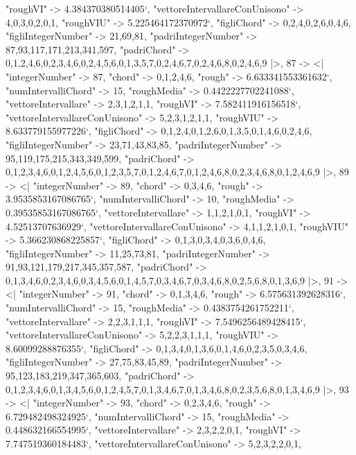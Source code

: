\documentclass[
]{article}
\begin{document}
\begin{DatasetVerbatim}
    "roughVI" -> 4.384370380514405`,
    "vettoreIntervallareConUnisono" -> {4,0,3,0,2,0,1},
    "roughVIU" -> 5.225464172370972`,
    "figliChord" -> {{0,2,4},{0,2,6},{0,4,6}},
    "figliIntegerNumber" -> {21,69,81},
    "padriIntegerNumber" -> {87,93,117,171,213,341,597},
    "padriChord" -> {{0,1,2,4,6},{0,2,3,4,6},{0,2,4,5,6},{0,1,3,5,7},{0,2,4,6,7},{0,2,4,6,8},{0,2,4,6,9}}
  |>,
  87 -> <|
    "integerNumber" -> 87,
    "chord" -> {0,1,2,4,6},
    "rough" -> 6.633341553361632`,
    "numIntervalliChord" -> 15,
    "roughMedia" -> 0.4422227702241088`,
    "vettoreIntervallare" -> {2,3,1,2,1,1},
    "roughVI" -> 7.582411916156518`,
    "vettoreIntervallareConUnisono" -> {5,2,3,1,2,1,1},
    "roughVIU" -> 8.633779155977226`,
    "figliChord" -> {{0,1,2,4},{0,1,2,6},{0,1,3,5},{0,1,4,6},{0,2,4,6}},
    "figliIntegerNumber" -> {23,71,43,83,85},
    "padriIntegerNumber" -> {95,119,175,215,343,349,599},
    "padriChord" -> {{0,1,2,3,4,6},{0,1,2,4,5,6},{0,1,2,3,5,7},{0,1,2,4,6,7},{0,1,2,4,6,8},{0,2,3,4,6,8},{0,1,2,4,6,9}}
  |>,
  89 -> <|
    "integerNumber" -> 89,
    "chord" -> {0,3,4,6},
    "rough" -> 3.9535853167086765`,
    "numIntervalliChord" -> 10,
    "roughMedia" -> 0.39535853167086765`,
    "vettoreIntervallare" -> {1,1,2,1,0,1},
    "roughVI" -> 4.52513707636929`,
    "vettoreIntervallareConUnisono" -> {4,1,1,2,1,0,1},
    "roughVIU" -> 5.366230868225857`,
    "figliChord" -> {{0,1,3},{0,3,4},{0,3,6},{0,4,6}},
    "figliIntegerNumber" -> {11,25,73,81},
    "padriIntegerNumber" -> {91,93,121,179,217,345,357,587},
    "padriChord" -> {{0,1,3,4,6},{0,2,3,4,6},{0,3,4,5,6},{0,1,4,5,7},{0,3,4,6,7},{0,3,4,6,8},{0,2,5,6,8},{0,1,3,6,9}}
  |>,
  91 -> <|
    "integerNumber" -> 91,
    "chord" -> {0,1,3,4,6},
    "rough" -> 6.575631392628316`,
    "numIntervalliChord" -> 15,
    "roughMedia" -> 0.4383754261752211`,
    "vettoreIntervallare" -> {2,2,3,1,1,1},
    "roughVI" -> 7.5496256489428415`,
    "vettoreIntervallareConUnisono" -> {5,2,2,3,1,1,1},
    "roughVIU" -> 8.60099288876355`,
    "figliChord" -> {{0,1,3,4},{0,1,3,6},{0,1,4,6},{0,2,3,5},{0,3,4,6}},
    "figliIntegerNumber" -> {27,75,83,45,89},
    "padriIntegerNumber" -> {95,123,183,219,347,365,603},
    "padriChord" -> {{0,1,2,3,4,6},{0,1,3,4,5,6},{0,1,2,4,5,7},{0,1,3,4,6,7},{0,1,3,4,6,8},{0,2,3,5,6,8},{0,1,3,4,6,9}}
  |>,
  93 -> <|
    "integerNumber" -> 93,
    "chord" -> {0,2,3,4,6},
    "rough" -> 6.729482498324925`,
    "numIntervalliChord" -> 15,
    "roughMedia" -> 0.448632166554995`,
    "vettoreIntervallare" -> {2,3,2,2,0,1},
    "roughVI" -> 7.747519360184483`,
    "vettoreIntervallareConUnisono" -> {5,2,3,2,2,0,1},

\end{DatasetVerbatim}
\end{document}
